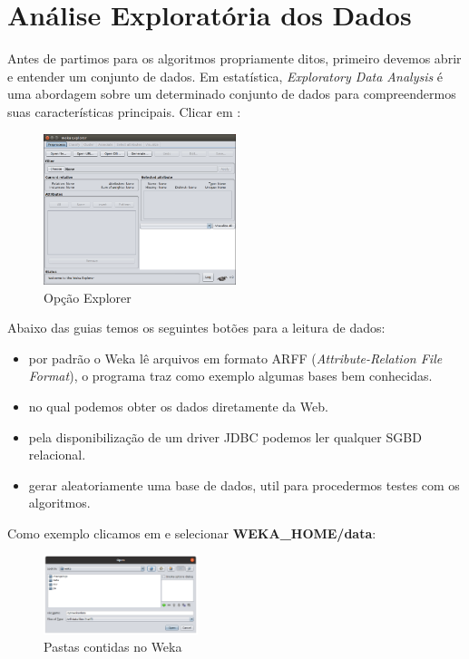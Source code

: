\documentclass[a4paper,11pt]{article}
\begin{document}
\section{Análise Exploratória dos Dados}
Antes de partimos para os algoritmos propriamente ditos, primeiro devemos abrir e entender um conjunto de dados. Em estatística, \textit{Exploratory Data Analysis} é uma abordagem sobre um determinado conjunto de dados para compreendermos suas características principais. Clicar em :
\begin{figure}[H]
	\centering
	\includegraphics[width=0.5\textwidth]{imagem/weka-explorer.png}
	\caption{Opção Explorer}
\end{figure}

Abaixo das guias temos os seguintes botões para a leitura de dados: \vspace{-1em}
\begin{itemize}
	\item {} por padrão o Weka lê arquivos em formato ARFF (\textit{Attribute-Relation File Format}), o programa traz como exemplo algumas bases bem conhecidas.
	\item {} no qual podemos obter os dados diretamente da Web.
	\item {} pela disponibilização de um driver JDBC podemos ler qualquer SGBD relacional.
	\item {} gerar aleatoriamente uma base de dados, util para procedermos testes com os algoritmos. 
\end{itemize}
	
Como exemplo clicamos em  e selecionar \textbf{WEKA\_HOME/data}:
\begin{figure}[H]
	\centering
	\includegraphics[width=0.4\textwidth]{imagem/diretorioData.png}
	\caption{Pastas contidas no Weka}
\end{figure}
\end{document}
